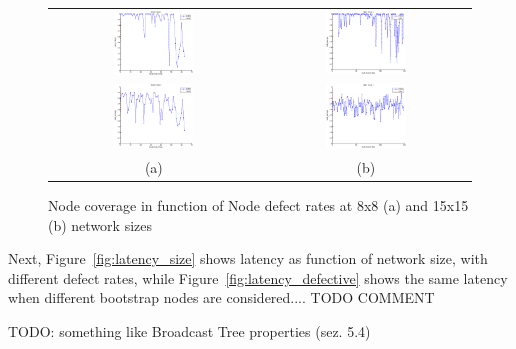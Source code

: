 \begin{figure}
  \centering
  \begin{tabular}{cc}
    \includegraphics[width=0.40\textwidth]{pictures/sim8x8_nodefect_Xbootstrap_Ycoverage.eps} & 
    \includegraphics[width=0.40\textwidth]{pictures/sim15x15_nodefect_Xbootstrap_Ycoverage.eps} \\
    \includegraphics[width=0.40\textwidth]{pictures/sim8x8_defect01_Xbootstrap_Ycoverage.eps} & 
    \includegraphics[width=0.40\textwidth]{pictures/sim15x15_defect01_Xbootstrap_Ycoverage.eps} \\
    (a) & (b)
  \end{tabular}
  \caption{Node coverage in function of Node defect rates at 8x8 (a) and 15x15 (b) network sizes}
  \label{fig:bootstrap}
\end{figure}

Next, Figure~\ref{fig:latency_size} shows latency as function of
network size, with different defect rates, while Figure~\ref{fig:latency_defective}
shows the same latency when different bootstrap nodes are
considered.... TODO COMMENT

TODO: something like Broadcast Tree properties (sez.  5.4)


